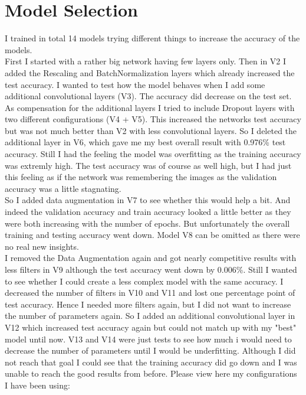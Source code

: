 \documentclass[]{article}
\begin{document}
\section{Model Selection}
I trained in total 14 models trying different things to increase the accuracy of the models.\\
First I started with a rather big network having few layers only. Then in V2 I added the Rescaling and BatchNormalization layers which already increased the test accuracy. I wanted to test how the model behaves when I add some additional convolutional layers (V3). The accuracy did decrease on the test set. As compensation for the additional layers I tried to include Dropout layers with two different configurations (V4 + V5). This increased the networks test accuracy but was not much better than V2 with less convolutional layers. So I deleted the additional layer in V6, which gave me my best overall result with 0.976\% test accuracy. Still I had the feeling the model was overfitting as the training accuracy was extremly high. The test accuracy was of course as well high, but I had just this feeling as if the network was remembering the images as the validation accuracy was a little stagnating.\\
So I added data augmentation in V7 to see whether this would help a bit. And indeed the validation accuracy and train accuracy looked a little better as they were both increasing with the number of epochs. But unfortunately the overall training and testing accuracy went down. Model V8 can be omitted as there were no real new insights.\\
I removed the Data Augmentation again and got nearly competitive results with less filters in V9 although the test accuracy went down by 0.006\%. Still I wanted to see whether I could create a less complex model with the same accuracy. I decreased the number of filters in V10 and V11 and lost one percentage point of test accuracy. Hence I needed more filters again, but I did not want to increase the number of parameters again. So I added an additional convolutional layer in V12 which increased test accuracy again but could not match up with my "best" model until now. V13 and V14 were just tests to see how much i would need to decrease the number of parameters until I would be underfitting. Although I did not reach that goal I could see that the training accuracy did go down and I was unable to reach the good results from before. Please view here my configurations I have been using:\\
\end{document}
